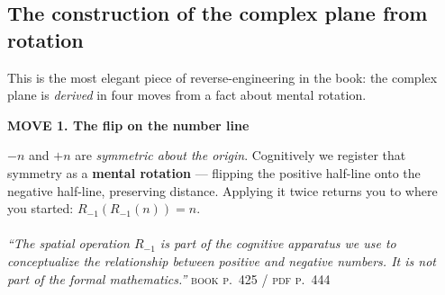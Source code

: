\clearpage
\subsection{The construction of the complex plane from rotation}

This is the most elegant piece of reverse-engineering in the book: the complex plane is
\emph{derived} in four moves from a fact about mental rotation.

\noindent\begin{minipage}[t]{0.505\textwidth}
\vspace{0pt}
\textbf{\color{csC}\textsf{MOVE 1.}\; The flip on the number line}\\[6pt]
\end{minipage}\hfill
\begin{minipage}[t]{0.455\textwidth}
\vspace{2pt}\footnotesize\color{slate}
$-n$ and $+n$ are \emph{symmetric about the origin}. Cognitively we register that symmetry as a
\textbf{mental rotation} --- flipping the positive half-line onto the negative half-line, preserving
distance. Applying it twice returns you to where you started: $R_{-1}(R_{-1}(n))=n$.\\[5pt]
\textcolor{csC}{\textbf{}}\\[3pt]
\textit{``The spatial operation $R_{-1}$ is part of the cognitive apparatus we use to conceptualize
the relationship between positive and negative numbers. It is not part of the formal mathematics.''}
\;\textsc{\scriptsize book p.~425 / pdf p.~444}
\end{minipage}

